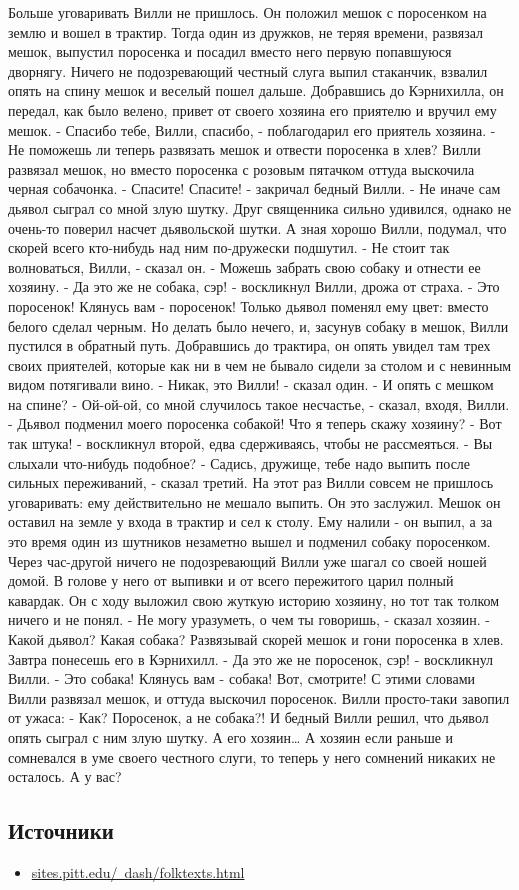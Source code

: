Больше уговаривать Вилли не пришлось. Он положил мешок с поросенком на землю и вошел в трактир. Тогда один из дружков, не теряя времени, развязал мешок, выпустил поросенка и посадил вместо него первую попавшуюся дворнягу.
Ничего не подозревающий честный слуга выпил стаканчик, взвалил опять на спину мешок и веселый пошел дальше. Добравшись до Кэрнихилла, он передал, как было велено, привет от своего хозяина его приятелю и вручил ему мешок.
- Спасибо тебе, Вилли, спасибо, - поблагодарил его приятель хозяина. - Не поможешь ли теперь развязать мешок и отвести поросенка в хлев?
Вилли развязал мешок, но вместо поросенка с розовым пятачком оттуда выскочила черная собачонка.
- Спасите! Спасите! - закричал бедный Вилли. - Не иначе сам дьявол сыграл со мной злую шутку.
Друг священника сильно удивился, однако не очень-то поверил насчет дьявольской шутки. А зная хорошо Вилли, подумал, что скорей всего кто-нибудь над ним по-дружески подшутил.
- Не стоит так волноваться, Вилли, - сказал он. - Можешь забрать свою собаку и отнести ее хозяину.
- Да это же не собака, сэр! - воскликнул Вилли, дрожа от страха. - Это поросенок! Клянусь вам - поросенок! Только дьявол поменял ему цвет: вместо белого сделал черным.
Но делать было нечего, и, засунув собаку в мешок, Вилли пустился в обратный путь. Добравшись до трактира, он опять увидел там трех своих приятелей, которые как ни в чем не бывало сидели за столом и с невинным видом потягивали вино.
- Никак, это Вилли! - сказал один. - И опять с мешком на спине?
- Ой-ой-ой, со мной случилось такое несчастье, - сказал, входя, Вилли. - Дьявол подменил моего поросенка собакой! Что я теперь скажу хозяину?
- Вот так штука! - воскликнул второй, едва сдерживаясь, чтобы не рассмеяться. - Вы слыхали что-нибудь подобное?
- Садись, дружище, тебе надо выпить после сильных переживаний, - сказал третий.
На этот раз Вилли совсем не пришлось уговаривать: ему действительно не мешало выпить. Он это заслужил.
Мешок он оставил на земле у входа в трактир и сел к столу. Ему налили - он выпил, а за это время один из шутников незаметно вышел и подменил собаку поросенком.
Через час-другой ничего не подозревающий Вилли уже шагал со своей ношей домой. В голове у него от выпивки и от всего пережитого царил полный кавардак. Он с ходу выложил свою жуткую историю хозяину, но тот так толком ничего и не понял.
- Не могу уразуметь, о чем ты говоришь, - сказал хозяин. - Какой дьявол? Какая собака? Развязывай скорей мешок и гони поросенка в хлев. Завтра понесешь его в Кэрнихилл.
- Да это же не поросенок, сэр! - воскликнул Вилли. - Это собака! Клянусь вам - собака! Вот, смотрите!
С этими словами Вилли развязал мешок, и оттуда выскочил поросенок. Вилли просто-таки завопил от ужаса:
- Как? Поросенок, а не собака?!
И бедный Вилли решил, что дьявол опять сыграл с ним злую шутку. А его хозяин…
А хозяин если раньше и сомневался в уме своего честного слуги, то теперь у него сомнений никаких не осталось.
А у вас?


\subsection*{Источники}

\begin{itemize}
    \item \href{https://sites.pitt.edu/~dash/folktexts.html}{sites.pitt.edu/~dash/folktexts.html} \\
\end{itemize}


